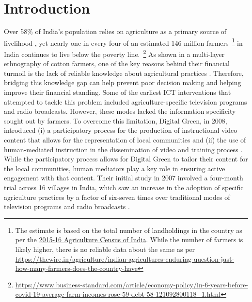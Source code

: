\documentclass[manuscript,screen]{acmart}
\begin{document}
\section{Introduction}
Over 58\% of India’s population relies on agriculture as a primary source of livelihood \cite{ibef}, yet nearly one in every four of an estimated 146 million farmers~\footnote{The estimate is based on the total number of landholdings in the country as per the \href{https://agcensus.nic.in/document/is2016/air_is_16-17_210121-final_220221.pdf}{2015-16 Agriculture Census of India}. While the number of farmers is likely higher, there is no reliable data about the same as per \url{https://thewire.in/agriculture/indian-agricultures-enduring-question-just-how-many-farmers-does-the-country-have}} in India continues to live below the poverty line.~\footnote{\url{https://www.business-standard.com/article/economy-policy/in-6-years-before-covid-19-average-farm-incomes-rose-59-debt-58-121092800118_1.html}} As shown in a multi-layer ethnography of cotton farmers, one of the key reasons behind their financial turmoil is the lack of reliable knowledge about agricultural practices \cite{stone2007agricultural}. Therefore, bridging this knowledge gap can help prevent poor decision making and helping improve their financial standing. Some of the earliest ICT interventions that attempted to tackle this problem included agriculture-specific television programs and radio broadcasts. However, these modes lacked the information specificity sought out by farmers. To overcome this limitation, Digital Green, in 2008, introduced (i) a participatory process for the production of instructional video content that allows for the representation of local communities and (ii) the use of human-mediated instruction in the dissemination of video and training process \cite{Gandhi}. While the participatory process allows for Digital Green to tailor their content for the local communities, human mediators play a key role in ensuring active engagement with that content. Their initial study in 2007 involved a four-month trial across 16 villages in India, which saw an increase in the adoption of specific agriculture practices by a factor of six-seven times over traditional modes of television programs and radio broadcasts \cite{Gandhi}. 
\end{document}
